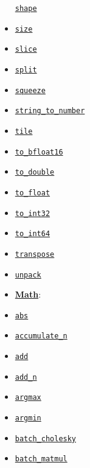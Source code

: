 \begin{itemize}
  \href{../../api_docs/python/array_ops.md\#shape}{\texttt{shape}}
\item
  \href{../../api_docs/python/array_ops.md\#size}{\texttt{size}}
\item
  \href{../../api_docs/python/array_ops.md\#slice}{\texttt{slice}}
\item
  \href{../../api_docs/python/array_ops.md\#split}{\texttt{split}}
\item
  \href{../../api_docs/python/array_ops.md\#squeeze}{\texttt{squeeze}}
\item
  \href{../../api_docs/python/array_ops.md\#string_to_number}{\texttt{string\_to\_number}}
\item
  \href{../../api_docs/python/array_ops.md\#tile}{\texttt{tile}}
\item
  \href{../../api_docs/python/array_ops.md\#to_bfloat16}{\texttt{to\_bfloat16}}
\item
  \href{../../api_docs/python/array_ops.md\#to_double}{\texttt{to\_double}}
\item
  \href{../../api_docs/python/array_ops.md\#to_float}{\texttt{to\_float}}
\item
  \href{../../api_docs/python/array_ops.md\#to_int32}{\texttt{to\_int32}}
\item
  \href{../../api_docs/python/array_ops.md\#to_int64}{\texttt{to\_int64}}
\item
  \href{../../api_docs/python/array_ops.md\#transpose}{\texttt{transpose}}
\item
  \href{../../api_docs/python/array_ops.md\#unpack}{\texttt{unpack}}
\item
  \textbf{\href{../../api_docs/python/math_ops.md}{Math}}:
\item
  \href{../../api_docs/python/math_ops.md\#abs}{\texttt{abs}}
\item
  \href{../../api_docs/python/math_ops.md\#accumulate_n}{\texttt{accumulate\_n}}
\item
  \href{../../api_docs/python/math_ops.md\#add}{\texttt{add}}
\item
  \href{../../api_docs/python/math_ops.md\#add_n}{\texttt{add\_n}}
\item
  \href{../../api_docs/python/math_ops.md\#argmax}{\texttt{argmax}}
\item
  \href{../../api_docs/python/math_ops.md\#argmin}{\texttt{argmin}}
\item
  \href{../../api_docs/python/math_ops.md\#batch_cholesky}{\texttt{batch\_cholesky}}
\item
  \href{../../api_docs/python/math_ops.md\#batch_matmul}{\texttt{batch\_matmul}}

\end{itemize}
